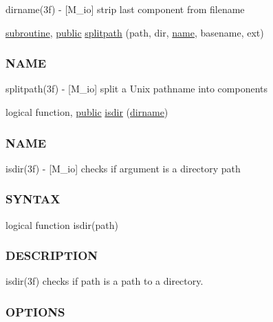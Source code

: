 \begin{DoxyCompactItemize}
\begin{DoxyCompactList}
dirname(3f) -\/ \mbox{[}M\+\_\+io\mbox{]} strip last component from filename \end{DoxyCompactList}\item 
\hyperlink{M__stopwatch_83_8txt_acfbcff50169d691ff02d4a123ed70482}{subroutine}, \hyperlink{M__stopwatch_83_8txt_a2f74811300c361e53b430611a7d1769f}{public} \hyperlink{namespacem__io_a7d1857c5c839bf3e096ce68fa1447d44}{splitpath} (path, dir, \hyperlink{M__stopwatch_83_8txt_a3f508a893ae4c3b397b4383e33b9bcae}{name}, basename, ext)
\begin{DoxyCompactList}\small\item\em \subsubsection*{N\+A\+ME}

splitpath(3f) -\/ \mbox{[}M\+\_\+io\mbox{]} split a Unix pathname into components \end{DoxyCompactList}\item 
logical function, \hyperlink{M__stopwatch_83_8txt_a2f74811300c361e53b430611a7d1769f}{public} \hyperlink{namespacem__io_a6793f5adc45177098781af4be39911ff}{isdir} (\hyperlink{namespacem__io_a85eb6aa886ca8e591fdc837919f81708}{dirname})
\begin{DoxyCompactList}\small\item\em \subsubsection*{N\+A\+ME}

isdir(3f) -\/ \mbox{[}M\+\_\+io\mbox{]} checks if argument is a directory path \subsubsection*{S\+Y\+N\+T\+AX}

logical function isdir(path) \subsubsection*{D\+E\+S\+C\+R\+I\+P\+T\+I\+ON}

isdir(3f) checks if path is a path to a directory. \subsubsection*{O\+P\+T\+I\+O\+NS}


\end{DoxyCompactList}
\end{DoxyCompactItemize}
